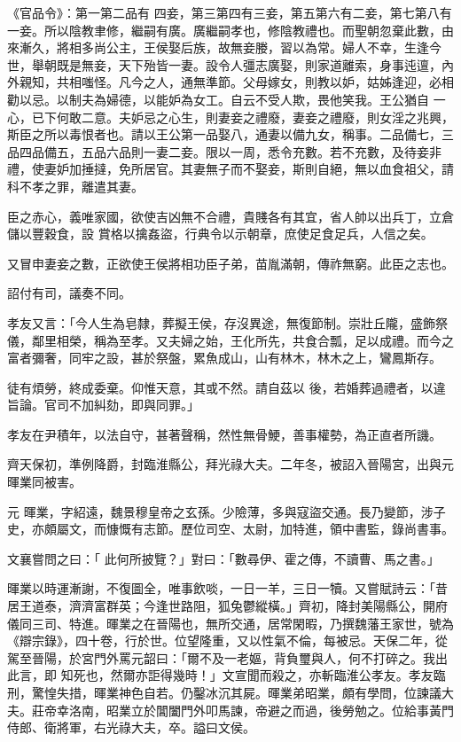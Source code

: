 \begin{pinyinscope}
 《官品令》：第一第二品有
 四妾，第三第四有三妾，第五第六有二妾，第七第八有一妾。所以陰教聿修，繼嗣有廣。廣繼嗣孝也，修陰教禮也。而聖朝忽棄此數，由來漸久，將相多尚公主，王侯娶后族，故無妾媵，習以為常。婦人不幸，生逢今世，舉朝既是無妾，天下殆皆一妻。設令人彊志廣娶，則家道離索，身事迍邅，內外親知，共相嗤怪。凡今之人，通無準節。父母嫁女，則教以妒，姑姊逢迎，必相勸以忌。以制夫為婦德，以能妒為女工。自云不受人欺，畏他笑我。王公猶自
 一心，已下何敢二意。夫妒忌之心生，則妻妾之禮廢，妻妾之禮廢，則女淫之兆興，斯臣之所以毒恨者也。請以王公第一品娶八，通妻以備九女，稱事。二品備七，三品四品備五，五品六品則一妻二妾。限以一周，悉令充數。若不充數，及待妾非禮，使妻妒加捶撻，免所居官。其妻無子而不娶妾，斯則自絕，無以血食祖父，請科不孝之罪，離遣其妻。



 臣之赤心，義唯家國，欲使吉凶無不合禮，貴賤各有其宜，省人帥以出兵丁，立倉儲以豐穀食，設
 賞格以擒姦盜，行典令以示朝章，庶使足食足兵，人信之矣。



 又冒申妻妾之數，正欲使王侯將相功臣子弟，苗胤滿朝，傳祚無窮。此臣之志也。



 詔付有司，議奏不同。



 孝友又言：「今人生為皂隸，葬擬王侯，存沒異途，無復節制。崇壯丘隴，盛飾祭儀，鄰里相榮，稱為至孝。又夫婦之始，王化所先，共食合瓢，足以成禮。而今之富者彌奢，同牢之設，甚於祭盤，累魚成山，山有林木，林木之上，鸞鳳斯存。



 徒有煩勞，終成委棄。仰惟天意，其或不然。請自茲以
 後，若婚葬過禮者，以違旨論。官司不加糾劾，即與同罪。」



 孝友在尹積年，以法自守，甚著聲稱，然性無骨鯁，善事權勢，為正直者所譏。



 齊天保初，準例降爵，封臨淮縣公，拜光祿大夫。二年冬，被詔入晉陽宮，出與元暉業同被害。



 元
 暉業，字紹遠，魏景穆皇帝之玄孫。少險薄，多與寇盜交通。長乃變節，涉子史，亦頗屬文，而慷慨有志節。歷位司空、太尉，加特進，領中書監，錄尚書事。



 文襄嘗問之曰：「
 此何所披覽？」對曰：「數尋伊、霍之傳，不讀曹、馬之書。」



 暉業以時運漸謝，不復圖全，唯事飲啖，一日一羊，三日一犢。又嘗賦詩云：「昔居王道泰，濟濟富群英；今逢世路阻，狐兔鬱縱橫。」齊初，降封美陽縣公，開府儀同三司、特進。暉業之在晉陽也，無所交通，居常閑暇，乃撰魏藩王家世，號為《辯宗錄》，四十卷，行於世。位望隆重，又以性氣不倫，每被忌。天保二年，從駕至晉陽，於宮門外罵元韶曰：「爾不及一老嫗，背負璽與人，何不打碎之。我出此言，即
 知死也，然爾亦詎得幾時！」文宣聞而殺之，亦斬臨淮公孝友。孝友臨刑，驚惶失措，暉業神色自若。仍鑿冰沉其屍。暉業弟昭業，頗有學問，位諫議大夫。莊帝幸洛南，昭業立於閶闔門外叩馬諫，帝避之而過，後勞勉之。位給事黃門侍郎、衛將軍，右光祿大夫，卒。謚曰文侯。




\end{pinyinscope}
